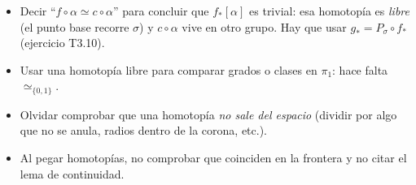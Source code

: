 \begin{itemize}
    \item Decir ``$f \circ \alpha \simeq c \circ \alpha$'' para concluir que $f_*[\alpha]$ es trivial: esa homotopía es \emph{libre} (el punto base recorre $\sigma$) y $c \circ \alpha$ vive en otro grupo. Hay que usar $g_* = P_\sigma \circ f_*$ (ejercicio T3.10).
    \item Usar una homotopía libre para comparar grados o clases en $\pi_1$: hace falta $\simeq_{\{0,1\}}$.
    \item Olvidar comprobar que una homotopía \emph{no sale del espacio} (dividir por algo que no se anula, radios dentro de la corona, etc.).
    \item Al pegar homotopías, no comprobar que coinciden en la frontera y no citar el lema de continuidad.
\end{itemize}
